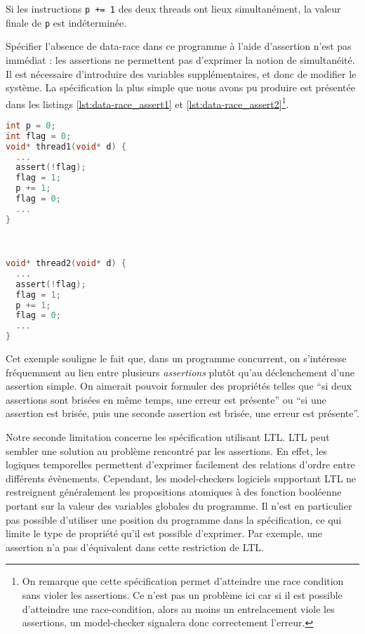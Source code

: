 Si les instructions \texttt{p += 1} des deux threads ont lieux simultanément, la
valeur finale de \texttt{p} est indéterminée.

Spécifier l'absence de data-race dans ce programme à l'aide d'assertion n'est
pas immédiat : les assertions ne permettent pas d'exprimer la notion de
simultanéité. Il est nécessaire d'introduire des variables supplémentaires, et
donc de modifier le système. La spécification la plus simple que nous avons pu
produire est présentée dans les listings \ref{lst:data-race_assert1} et
\ref{lst:data-race_assert2}\footnote{On remarque que cette spécification permet
  d'atteindre une race condition sans violer les assertions. Ce n'est pas un
problème ici car si il est possible d'atteindre une race-condition, alors au
moins un entrelacement viole les assertions, un model-checker signalera donc
correctement l'erreur.}.

\noindent\begin{minipage}{.45\textwidth}
  \begin{lstlisting}[language=C, frame=single, caption=Thread 1,
    label=lst:data-race_assert1]
int p = 0;
int flag = 0;
void* thread1(void* d) {
  ...
  assert(!flag);
  flag = 1;
  p += 1;
  flag = 0;
  ...
}
\end{lstlisting}
\end{minipage}\hfill
\begin{minipage}{.45\textwidth}
\begin{lstlisting}[language=C, frame=single, caption=Thread 2,
    label=lst:data-race_assert2]


void* thread2(void* d) {
  ...
  assert(!flag);
  flag = 1;
  p += 1;
  flag = 0;
  ...
}
\end{lstlisting}
\end{minipage}

Cet exemple souligne le fait que, dans un programme concurrent, on
s'intéresse fréquemment au lien entre plusieurs \emph{assertions} plutôt qu'au
déclenchement d'une assertion simple. On aimerait pouvoir formuler des
propriétés telles que ``si deux assertions sont brisées en même temps, une
erreur est présente'' ou ``si une assertion est brisée, puis une seconde
assertion est brisée, une erreur est présente''.

Notre seconde limitation concerne les spécification utilisant \ac{LTL}. \ac{LTL}
peut sembler une solution au problème rencontré par les assertions. En effet,
les logiques temporelles permettent d'exprimer facilement des relations d'ordre
entre différents évènements.
Cependant, les model-checkers logiciels supportant LTL ne restreignent
généralement les propositions atomiques à des fonction booléenne portant sur la
valeur des variables globales du programme. Il n'est en particulier pas possible
d'utiliser une position du programme dans la spécification, ce qui limite le
type de propriété qu'il est possible d'exprimer. Par exemple, une assertion n'a
pas d'équivalent dans cette restriction de LTL.

